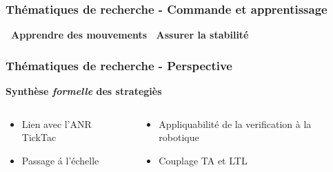 \documentclass[usenames,dvipsnames,xcolor=table]{beamer}
\begin{document}

\begin{frame}
    \frametitle{Th\'ematiques de recherche - Commande et apprentissage}
    \vspace{-10pt}
    \begin{center}
        \hspace{-30pt}\textbf{\textbullet~Apprendre des mouvements \hspace{25pt} \textbullet~Assurer la stabilit\'e} \\ 
        \vspace{15pt}
        \def\svgwidth{0.99\linewidth}
		{
		
		}
    \end{center}
\end{frame}


\begin{frame}
    \frametitle{Th\'ematiques de recherche - Perspective}
	\vspace{-10pt}
    \begin{center}
	    \textbf{Synth\`ese \textit{formelle} des strategi\`es }    
	\vspace{0pt}
    \begin{columns}
    \begin{column}{0.5\linewidth}
    \begin{itemize}
        \item Lien avec l'ANR TickTac
        \item Passage \'a l'\'echelle
    \end{itemize}
    \end{column}
    \begin{column}{0.5\linewidth}
    \begin{itemize}
    	\item Appliquabilit\'e de la verification \`a la robotique
    	\item Couplage TA et LTL    
    \end{itemize}
    \end{column}
    \end{columns}    
    
    \vspace{10pt}
    \def\svgwidth{0.7\linewidth}
	{
	
	}    
    \end{center}
\end{frame}
\end{document}

